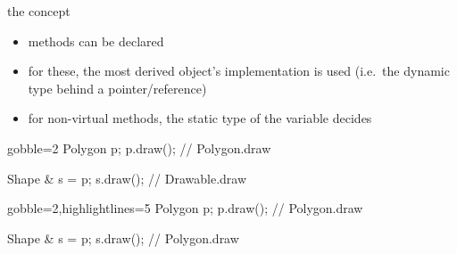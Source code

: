 \begin{frame}[fragile]
  \begin{block}{the concept}
    \begin{itemize}
    \item methods can be declared 
    \item for these, the most derived object's implementation is used
          (i.e.\ the dynamic type behind a pointer/reference)
    \item for non-virtual methods, the static type of the variable decides
    \end{itemize}
  \end{block}
  \begin{overprint}
  \begin{multicols}{2}
    \begin{cppcode*}{gobble=2}
      Polygon p;
      p.draw(); // Polygon.draw

      Shape & s = p;
      s.draw(); // Drawable.draw
    \end{cppcode*}
    \columnbreak
    \center
  \end{multicols}

    \begin{multicols}{2}
    \begin{cppcode*}{gobble=2,highlightlines=5}
      Polygon p;
      p.draw(); // Polygon.draw

      Shape & s = p;
      s.draw(); // Polygon.draw
    \end{cppcode*}
    \columnbreak
    \center
  \end{multicols}
  \end{overprint}
\end{frame}


